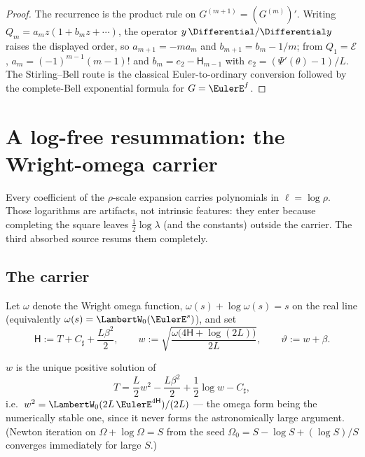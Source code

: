 \documentclass[11pt,oneside]{article}
\numberwithin{equation}{section}
\theoremstyle{definition}
\theoremstyle{remark}
\newcommand{\Csharp}{C_{\sharp}}
\newcommand{\Hnum}{\mathsf H}
\begin{document}
\begin{proof}
The recurrence is the product rule on
$G^{(m+1)}=(G^{(m)})'$.  Writing
$Q_m=a_mz(1+b_mz+\cdots)$, the operator $y\,\Differential/\Differential y$ raises the
displayed order, so $a_{m+1}=-ma_m$ and $b_{m+1}=b_m-1/m$; from
$Q_1=\mathcal E$, $a_m=(-1)^{m-1}(m-1)!$ and
$b_m=e_2-\Hnum_{m-1}$ with $e_2=(\Psi'(\theta)-1)/L$.  The
Stirling--Bell route is the classical Euler-to-ordinary conversion
followed by the complete-Bell exponential formula for
$G=\EulerE^{f}$.
\end{proof}


\section{A log-free resummation: the Wright-omega carrier}
\label{sec:wcarrier}

Every coefficient of the $\rho$-scale expansion carries polynomials in
$\ell=\log\rho$.  Those logarithms are artifacts, not intrinsic
features: they enter because completing the square leaves
$\tfrac12\log\lambda$ (and the constants) outside the carrier.  The
third absorbed source resums them completely.

\subsection{The carrier}

Let $\omega$ denote the Wright omega function,
$\omega(s)+\log\omega(s)=s$ on the real line
(equivalently $\omega(s)=\LambertW_0(\EulerE^{s})$), and set
\begin{equation}
 \mathsf H:=T+\Csharp+\frac{L\beta^{2}}2,
 \qquad
 w:=\sqrt{\frac{\omega\bigl(4\mathsf H+\log(2L)\bigr)}{2L}},
 \qquad
 \vartheta:=w+\beta.
 \label{eq:w-def}
\end{equation}

\begin{proposition}
\label{prop:carrier-equation}
$w$ is the unique positive solution of
\begin{equation}
 T=\frac L2w^{2}-\frac{L\beta^{2}}2+\frac12\log w-\Csharp,
 \label{eq:w-carrier}
\end{equation}
i.e.\ $w^{2}=\LambertW_0(2L\,\EulerE^{4\mathsf H})/(2L)$ --- the omega form
being the numerically stable one, since it never forms the
astronomically large argument.  (Newton iteration on
$\Omega+\log\Omega=S$ from the seed $\Omega_0=S-\log S+(\log S)/S$
converges immediately for large $S$.)
\end{proposition}
\end{document}
